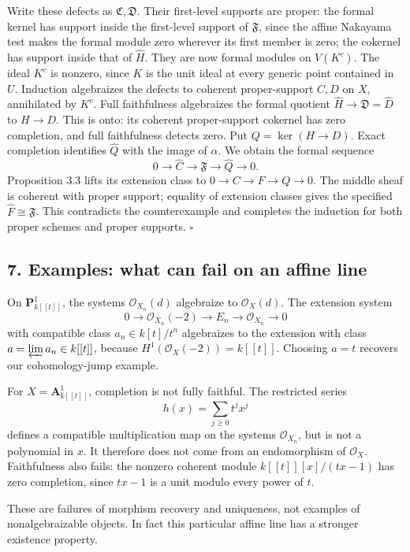 \documentclass[11pt]{article}
\begin{document}
Write these defects as \(\mathfrak C,\mathfrak D\). Their first-level
supports are proper: the formal kernel has support inside the
first-level support of \(\mathfrak F\), since the affine Nakayama test
makes the formal module zero wherever its first member is zero; the
cokernel has support inside that of \(\widehat H\). They are now formal
modules on \(V(K^c)\). The ideal \(K^c\) is nonzero, since \(K\) is the
unit ideal at every generic point contained in \(U\). Induction
algebraizes the defects to coherent proper-support \(C,D\) on \(X\),
annihilated by \(K^c\). Full faithfulness algebraizes the formal
quotient \(\widehat H\to\mathfrak D=\widehat D\) to \(H\to D\). This is
onto: its coherent proper-support cokernel has zero completion, and full
faithfulness detects zero. Put \(Q=\ker(H\to D)\). Exact completion
identifies \(\widehat Q\) with the image of \(\alpha\). We obtain the
formal sequence \[
0\to\widehat C\to\mathfrak F\to\widehat Q\to0.
\] Proposition 3.3 lifts its extension class to
\(0\to C\to F\to Q\to0\). The middle sheaf is coherent with proper
support; equality of extension classes gives the specified
\(\widehat F\cong\mathfrak F\). This contradicts the counterexample and
completes the induction for both proper schemes and proper supports.
\(\square\)

\subsection{7. Examples: what can fail on an affine
line}\label{examples-what-can-fail-on-an-affine-line}

On \(\mathbf P^1_{k[[t]]}\), the systems \(\mathcal O_{X_n}(d)\)
algebraize to \(\mathcal O_X(d)\). The extension system \[
0\to\mathcal O_{X_n}(-2)\to E_n\to\mathcal O_{X_n}\to0
\] with compatible class \(a_n\in k[t]/t^n\) algebraizes to the
extension with class \(a=\varprojlim a_n\in k[[t]]\), because
\(H^1(\mathcal O_X(-2))=k[[t]]\). Choosing \(a=t\) recovers our
cohomology-jump example.

For \(X=\mathbf A^1_{k[[t]]}\), completion is not fully faithful. The
restricted series \[
h(x)=\sum_{j\geq0}t^jx^j
\] defines a compatible multiplication map on the systems
\(\mathcal O_{X_n}\), but is not a polynomial in \(x\). It therefore
does not come from an endomorphism of \(\mathcal O_X\). Faithfulness
also fails: the nonzero coherent module \(k[[t]][x]/(tx-1)\) has zero
completion, since \(tx-1\) is a unit modulo every power of \(t\).

These are failures of morphism recovery and uniqueness, not examples of
nonalgebraizable objects. In fact this particular affine line has a
stronger existence property.
\end{document}
